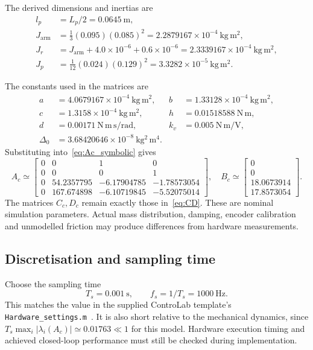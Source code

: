 \begin{samepage}
The derived dimensions and inertias are
\begin{align}
l_p&=L_p/2=0.0645~\mathrm m,\\
J_{\mathrm{arm}}&=\tfrac13(0.095)(0.085)^2
=2.2879167\times10^{-4}~\mathrm{kg\,m^2},\\
J_r&=J_{\mathrm{arm}}+4.0\times10^{-6}+0.6\times10^{-6}
=2.3339167\times10^{-4}~\mathrm{kg\,m^2},\\
J_p&=\tfrac1{12}(0.024)(0.129)^2
=3.3282\times10^{-5}~\mathrm{kg\,m^2}.
\end{align}
\end{samepage}
The constants used in the matrices are
\begin{align}
a&=4.0679167\times10^{-4}~\mathrm{kg\,m^2},&
b&=1.33128\times10^{-4}~\mathrm{kg\,m^2},\\
c&=1.3158\times10^{-4}~\mathrm{kg\,m^2},&
h&=0.01518588~\mathrm{N\,m},\\
d&=0.00171~\mathrm{N\,m\,s/rad},&
k_v&=0.005~\mathrm{N\,m/V},\\
\Delta_0&=3.68420646\times10^{-8}~\mathrm{kg^2\,m^4}.&&
\end{align}
Substituting into~\eqref{eq:Ac_symbolic} gives
\begin{equation}\label{eq:Ac_numeric}
A_c\simeq
\begin{bmatrix}
0&0&1&0\\0&0&0&1\\
0&54.2357795&-6.17904785&-1.78573054\\
0&167.674898&-6.10719845&-5.52075014
\end{bmatrix},\quad
B_c\simeq\begin{bmatrix}0\\0\\18.0673914\\17.8573054\end{bmatrix}.
\end{equation}
The matrices $C_c,D_c$ remain exactly those in~\eqref{eq:CD}.
These are nominal simulation parameters. Actual mass distribution, damping,
encoder calibration and unmodelled friction may produce differences from
hardware measurements.

\subsection{Discretisation and sampling time}

Choose the sampling time
\begin{equation}
\boxed{T_s=0.001~\mathrm s,\qquad f_s=1/T_s=1000~\mathrm{Hz}.}
\end{equation}
This matches the value in the supplied ControLab template's
\texttt{Hardware\_settings.m}~\cite{hardware_template}. It is also short
relative to the mechanical dynamics, since
$T_s\max_i|\lambda_i(A_c)|\simeq0.01763\ll1$ for this model. Hardware execution timing
and achieved closed-loop performance must still be checked during
implementation.


